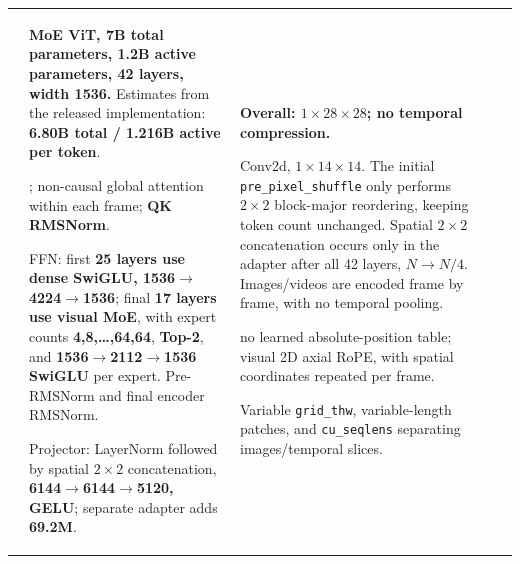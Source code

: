 \begin{longtable}{@{}P{0.100\dimexpr\textwidth-40pt\relax}P{0.230\dimexpr\textwidth-40pt\relax}P{0.290\dimexpr\textwidth-40pt\relax}P{0.240\dimexpr\textwidth-40pt\relax}P{0.140\dimexpr\textwidth-40pt\relax}@{}}
 & {\bfseries MoE ViT, 7B total parameters, 1.\allowbreak{}2B active parameters, 42 layers, width 1536.\allowbreak{}} Estimates from the released implementation: {\bfseries 6.\allowbreak{}80B total /\allowbreak{} 1.\allowbreak{}216B active per token}.\allowbreak{}\par{}; non-\allowbreak{}causal global attention within each frame; {\bfseries QK RMSNorm}.\allowbreak{}\par\vspace{1pt}FFN: first {\bfseries 25 layers use dense SwiGLU, 1536\(\rightarrow\)4224\(\rightarrow\)1536}; final {\bfseries 17 layers use visual MoE}, with expert counts {\bfseries 4,8,…,64,64}, {\bfseries Top-\allowbreak{}2}, and {\bfseries 1536\(\rightarrow\)2112\(\rightarrow\)1536 SwiGLU} per expert.\allowbreak{} Pre-\allowbreak{}RMSNorm and final encoder RMSNorm.\allowbreak{}\par\vspace{1pt}Projector: LayerNorm followed by spatial \(2\times 2\) concatenation, {\bfseries 6144\(\rightarrow\)6144\(\rightarrow\)5120, GELU}; separate adapter adds {\bfseries 69.\allowbreak{}2M}.\allowbreak{} & {\bfseries Overall: \(1\times 28\times 28\); no temporal compression.\allowbreak{}}\par{} Conv2d, \(1\times 14\times 14\).\allowbreak{} The initial \texttt{pre\_\allowbreak{}pixel\_\allowbreak{}shuffle} only performs \(2\times 2\) block-\allowbreak{}major reordering, keeping token count unchanged.\allowbreak{} Spatial \(2\times 2\) concatenation occurs only in the adapter after all 42 layers, {\bfseries \(N\rightarrow N/4\)}.\allowbreak{} Images/\allowbreak{}videos are encoded frame by frame, with no temporal pooling.\allowbreak{}\par\vspace{1pt}{\bfseries Position:} no learned absolute-\allowbreak{}position table; visual 2D axial RoPE, with spatial coordinates repeated per frame.\allowbreak{}\par{} Variable \texttt{grid\_\allowbreak{}thw}, variable-\allowbreak{}length patches, and \texttt{cu\_\allowbreak{}seqlens} separating images/\allowbreak{}temporal slices.\allowbreak{} & \textemdash{} & \textemdash{} \\
\end{longtable}
\endgroup


